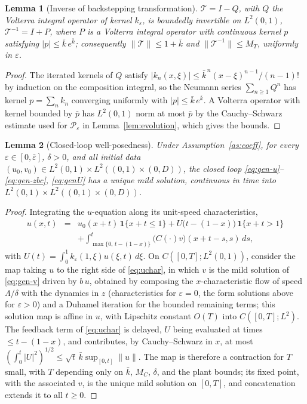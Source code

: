 \documentclass[12pt]{article}
\theoremstyle{plain}
\newtheorem{lemma}{Lemma}
\theoremstyle{remark}
\newcommand{\PP}{\mathcal P}
\newcommand{\TT}{\mathcal T}
\begin{document}
\begin{lemma}[Inverse of backstepping transformation]\label{lem:invert}
$\TT=I-Q$, with $Q$ the Volterra integral operator of kernel $k_\varepsilon$, is boundedly invertible on $L^2(0,1)$, $\TT^{-1}=I+P$, where $P$ is a Volterra integral operator with continuous kernel $p$ satisfying $|p|\le\bar k\,e^{\bar k}$; consequently $\|\TT\|\le1+\bar k$ and $\|\TT^{-1}\|\le M_T$, uniformly in $\varepsilon$.
\end{lemma}

\begin{proof}
The iterated kernels of $Q$ satisfy $|k_n(x,\xi)|\le\bar k^{\,n}(x-\xi)^{n-1}/(n-1)!$ by induction on the composition integral, so the Neumann series $\sum_{n\ge1}Q^n$ has kernel $p=\sum_nk_n$ converging uniformly with $|p|\le\bar k\,e^{\bar k}$. A Volterra operator with kernel bounded by $\bar p$ has $L^2(0,1)$ norm at most $\bar p$ by the Cauchy--Schwarz estimate used for $\PP_\varepsilon$ in Lemma~\ref{lem:evolution}, which gives the bounds.
\end{proof}

\begin{lemma}[Closed-loop well-posedness]\label{lem:wellposed}
Under Assumption~\ref{as:coeff}, for every $\varepsilon\in[0,\bar\varepsilon]$, $\delta>0$, and all initial data $(u_0,v_0)\in L^2(0,1)\times L^2((0,1)\times(0,D))$, the closed loop \eqref{eq:gen-u}--\eqref{eq:gen-zbc}, \eqref{eq:genU} has a unique mild solution, continuous in time into $L^2(0,1)\times L^2((0,1)\times(0,D))$.
\end{lemma}

\begin{proof}
Integrating the $u$-equation along its unit-speed characteristics,
\begin{eqnarray}
 u(x,t)&=&u_0(x+t)\,\mathbf 1\{x+t\le1\}
 +U\big(t-(1-x)\big)\,\mathbf 1\{x+t>1\}
 \nonumber\\
 &&+\int_{\max\{0,\,t-(1-x)\}}^{t}\big(C(\cdot)v\big)(x+t-s,s)\,ds,
 \label{eq:uchar}
\end{eqnarray}
with $U(t)=\int_0^1k_\varepsilon(1,\xi)u(\xi,t)\,d\xi$. On $C([0,T];L^2(0,1))$, consider the map taking $u$ to the right side of \eqref{eq:uchar}, in which $v$ is the mild solution of \eqref{eq:gen-v} driven by $b\,u$, obtained by composing the $x$-characteristic flow of speed $\Lambda/\delta$ with the dynamics in $z$ (characteristics for $\varepsilon=0$, the form solutions above for $\varepsilon>0$) and a Duhamel iteration for the bounded remaining terms; this solution map is affine in $u$, with Lipschitz constant $O(T)$ into $C([0,T];L^2)$. The feedback term of \eqref{eq:uchar} is delayed, $U$ being evaluated at times $\le t-(1-x)$, and contributes, by Cauchy--Schwarz in $x$, at most $(\int_0^t|U|^2)^{1/2}\le\sqrt t\,\bar k\sup_{[0,t]}\|u\|$. The map is therefore a contraction for $T$ small, with $T$ depending only on $\bar k$, $M_C$, $\delta$, and the plant bounds; its fixed point, with the associated $v$, is the unique mild solution on $[0,T]$, and concatenation extends it to all $t\ge0$.
\end{proof}
\end{document}
